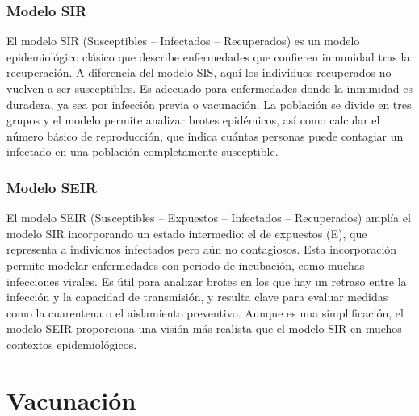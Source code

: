 \subsubsection*{Modelo SIR}
El modelo SIR (Susceptibles – Infectados – Recuperados) es un modelo epidemiológico clásico que describe enfermedades que confieren inmunidad tras la recuperación. A diferencia del modelo SIS, aquí los individuos recuperados no vuelven a ser susceptibles. Es adecuado para enfermedades donde la inmunidad es duradera, ya sea por infección previa o vacunación. La población se divide en tres grupos y el modelo permite analizar brotes epidémicos, así como calcular el número básico de reproducción, que indica cuántas personas puede contagiar un infectado en una población completamente susceptible.


\subsubsection*{Modelo SEIR}
El modelo SEIR (Susceptibles – Expuestos – Infectados – Recuperados) amplía el modelo SIR incorporando un estado intermedio: el de expuestos (E), que representa a individuos infectados pero aún no contagiosos. Esta incorporación permite modelar enfermedades con periodo de incubación, como muchas infecciones virales. Es útil para analizar brotes en los que hay un retraso entre la infección y la capacidad de transmisión, y resulta clave para evaluar medidas como la cuarentena o el aislamiento preventivo. Aunque es una simplificación, el modelo SEIR proporciona una visión más realista que el modelo SIR en muchos contextos epidemiológicos.





\section{Vacunación}
